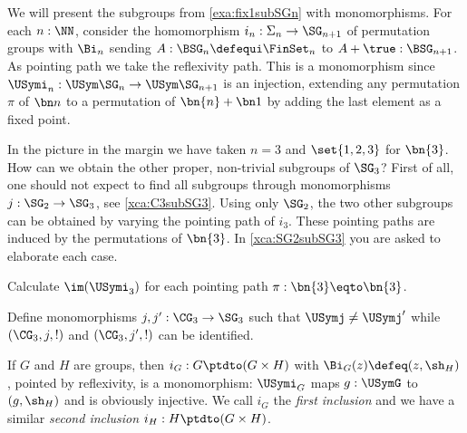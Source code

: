 \begin{example}
  \label{ex:SGninSGn+1}
We will present the subgroups from \cref{exa:fix1subSGn} with
monomorphisms. For each $n:\NN$, consider the  homomorphism 
$i_n:\Sigma_n\to\SG_{n+1}$ of permutation groups
with $\Bi_n$ sending $A:\BSG_n\defequi \FinSet_n$ to $A+\true:\BSG_{n+1}$.
As pointing path we take the reflexivity path.
This is a monomorphism since $\USymi_n:\USym\SG_n\to\USym\SG_{n+1}$ 
is an injection, extending any permutation $\pi$ of $\bn n$ to 
a permutation of $\bn{n}+\bn1$ by adding the last element as a
fixed point.

In the picture in the margin we have taken $n=3$ and
$\set{1,2,3}$ for $\bn{3}$. How can we obtain the other proper,
non-trivial subgroups of $\SG_3$? First of all, one should not
expect to find all subgroups through monomorphisms $j:\SG_2\to\SG_3$,
see \cref{xca:C3subSG3}. Using only $\SG_2$, the
two other subgroups can be obtained by varying the pointing
path of $i_3$. These pointing paths are induced by the permutations 
of $\bn{3}$. In \cref{xca:SG2subSG3} you are asked to elaborate each case.
\end{example}

\begin{xca}\label{xca:SG2subSG3}
Calculate $\im(\USymi_3)$ for each pointing path $\pi:\bn{3}\eqto\bn{3}$.
\end{xca}

\begin{xca}\label{xca:C3subSG3}
Define monomorphisms $j,j':\CG_3\to\SG_3$ such that $\USymj\neq \USymj'$
while $(\CG_3,j,!)$ and $(\CG_3,j',!)$ can be identified.
\end{xca}

\begin{example}
  \label{ex:prodinclismono}
  If $G$ and $H$ are groups, then $i_G : G \ptdto (G\times H)$ with
  $\Bi_G(z) \defeq (z,\sh_H)$, pointed by reflexivity, is a monomorphism:
  $\USymi_G$ maps $g:\USymG$ to $(g,\sh_H)$ and is obviously injective.
  We call $i_G$ the \emph{first inclusion} and we have a similar
  \emph{second inclusion} $i_H : H \ptdto (G\times H)$.
  \end{example}


